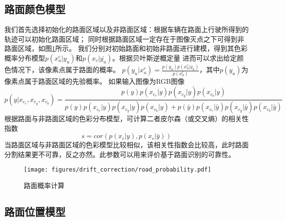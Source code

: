 \subsection{路面颜色模型}
我们首先选择初始化的路面区域以及非路面区域：根据车辆在路面上行驶所得到的轨迹可以初始化路面区域；
同时根据路面区域一定存在于图像灭点之下可得到非路面区域，如图\ref{fig:road_prob}所示。
我们分别对初始路面和初始非路面进行建模，得到其色彩概率分布模型$p(x_u^c|y_u)$和$p(x_c|\bar {y_u})$。根据贝叶斯逆概定量
进而可以求出给定颜色情况下，该像素点属于路面的概率。
$p(y_u|x_u^c) = \frac{p(y_u) p(x_u^c|y_u)}{p(x_u^c)}$，其中$p(y_u)$为像素点属于路面区域的先验概率。
如果输入图像为RGB图像
\begin{equation}
    p(y|x_{c_r},x_{c_g},x_{c_b}) = \frac{p(y) p(x_{c_r}|y) p(x_{c_g}|y) p(x_{c_b}|y)}{p(y) p(x_{c_r}|y) p(x_{c_g}|y) p(x_{c_b}|y)+p(\bar y) p(x_{c_r}|\bar y) p(x_{c_g}|\bar y) p(x_{c_b}|\bar y)}
\end{equation}
根据路面与非路面区域的色彩分布模型，可计算二者皮尔森（或交叉熵）的相关性指数
\begin{equation}
    s = cor(p(x_c|y),p(x_c|\bar y))
\end{equation}
当路面区域与非路面区域的色彩模型比较相似，该相关性指数会比较高，此时路面分割结果更不可靠，反之亦然。此参数可以用来评价基于路面识别的可靠性。
\begin{figure}[h]
    \centering
    \texttt{[image: figures/drift\_correction/road\_probability.pdf]}
    \caption{路面概率计算}
    \label{fig:road_prob}
\end{figure}

\subsection{路面位置模型}

